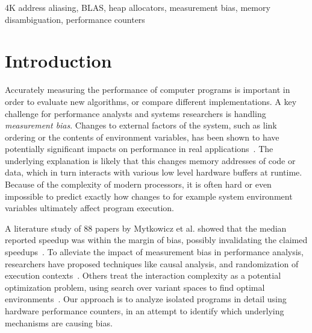 \documentclass[10pt, conference, compsocconf]{IEEEtran}
\begin{document}

\begin{IEEEkeywords}
4K address aliasing, BLAS, heap allocators, measurement bias, memory disambiguation, performance counters
\end{IEEEkeywords}








\section{Introduction}
Accurately measuring the performance of computer programs is important in order to evaluate new algorithms, or compare different implementations.
A key challenge for performance analysts and systems researchers is handling \emph{measurement bias}.
Changes to external factors of the system, such as link ordering or the contents of environment variables, has been shown to have potentially significant impacts on performance in real applications~\cite{Mytkowicz:2009:WrongData}.
The underlying explanation is likely that this changes memory addresses of code or data, which in turn interacts with various low level hardware buffers at runtime.
Because of the complexity of modern processors, it is often hard or even impossible to predict exactly how changes to for example system environment variables ultimately affect program execution.


A literature study of 88 papers by Mytkowicz et al. showed that the median reported speedup was within the margin of bias, possibly invalidating the claimed speedups~\cite{Mytkowicz:2008:OE&MB}.
To alleviate the impact of measurement bias in performance analysis, researchers have proposed techniques like causal analysis, and randomization of execution contexts~\cite{Mytkowicz:2008:OE&MB}.
Others treat the interaction complexity as a potential optimization problem, using search over variant spaces to find optimal environments~\cite{Knights:2009:BlindOpt}.
Our approach is to analyze isolated programs in detail using hardware performance counters, in an attempt to identify which underlying mechanisms are causing bias.
\end{document}
